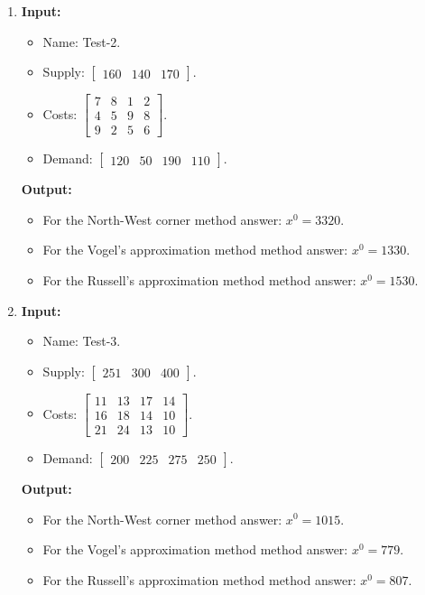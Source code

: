 \documentclass{article}
\begin{document}
\begin{enumerate}[label={(\arabic*)}, itemsep=0.25in]
\item \textbf{Input:}
\begin{itemize}
\item Name: Test-2.
\item Supply: \(\begin{bmatrix} 160 & 140 & 170 \end{bmatrix}\).
\item Costs: \(\begin{bmatrix}
7 & 8 & 1 & 2 \\
4 & 5 & 9 & 8 \\
9 & 2 & 5 & 6
\end{bmatrix}\).
\item Demand: \(\begin{bmatrix} 120 & 50 & 190 & 110 \end{bmatrix}\).
\end{itemize}
\textbf{Output:}
\begin{itemize}
\item For the North-West corner method answer: \(x^0 = 3320\).
\item For the Vogel’s approximation method method answer: \(x^0 = 1330\).
\item For the Russell’s approximation method method answer: \(x^0 = 1530\).
\end{itemize}

\item \textbf{Input:}
\begin{itemize}
\item Name: Test-3.
\item Supply: \(\begin{bmatrix} 251 & 300 & 400 \end{bmatrix}\).
\item Costs: \(\begin{bmatrix}
11 & 13 & 17 & 14 \\
16 & 18 & 14 & 10 \\
21 & 24 & 13 & 10
\end{bmatrix}\).
\item Demand: \(\begin{bmatrix} 200 & 225 & 275 & 250 \end{bmatrix}\).
\end{itemize}
\textbf{Output:}
\begin{itemize}
\item For the North-West corner method answer: \(x^0 = 1015\).
\item For the Vogel’s approximation method method answer: \(x^0 = 779\).
\item For the Russell’s approximation method method answer: \(x^0 = 807\).
\end{itemize}
\end{enumerate}
\end{document}
